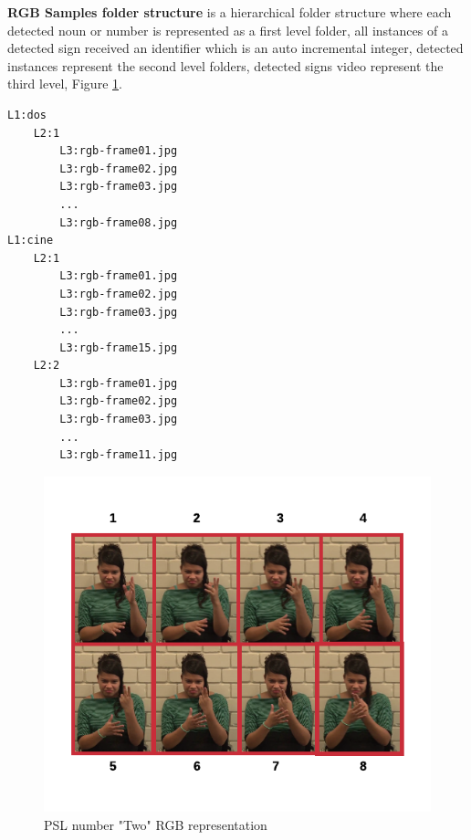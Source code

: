 \documentclass[twocolumn,conference]{article}
\begin{document}
\textbf{RGB Samples folder structure} is a hierarchical folder structure where each detected noun or number is represented as a first level folder, all instances of a detected sign received an identifier which is an auto incremental integer, detected instances represent the second level folders, detected signs video represent the third level, Figure \ref{fig:rgb-two}.
\begin{lstlisting}[caption=RGB Samples Folder Structure example, basicstyle=\ttfamily\small]
L1:dos
	L2:1
		L3:rgb-frame01.jpg
		L3:rgb-frame02.jpg
		L3:rgb-frame03.jpg
		...
		L3:rgb-frame08.jpg
L1:cine
	L2:1
		L3:rgb-frame01.jpg
		L3:rgb-frame02.jpg
		L3:rgb-frame03.jpg
		...
		L3:rgb-frame15.jpg
	L2:2
		L3:rgb-frame01.jpg
		L3:rgb-frame02.jpg
		L3:rgb-frame03.jpg
		...
		L3:rgb-frame11.jpg
\end{lstlisting}\label{list:rgb-samples-folders}

\begin{figure}[hbt!]
\includegraphics[width=\linewidth]{images/dos-rgb-frames.png}
\caption{PSL number "Two" RGB representation}
\label{fig:rgb-two}
\end{figure}
\end{document}
